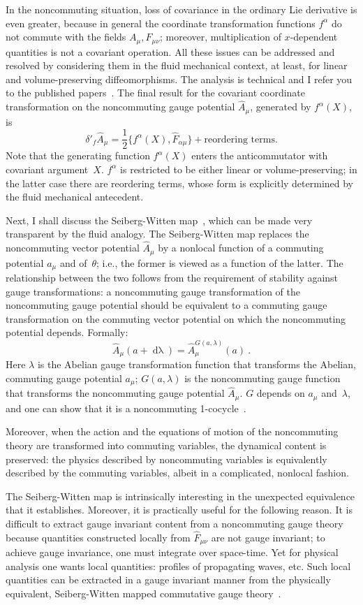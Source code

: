 \documentclass[a4paper,12pt,twoside]{article}
\newcommand{\rd}[1]{\mathop{\mathrm{d}#1}}
\newcommand{\fract}[2]{{\textstyle\frac{#1}{#2}}}
\newcommand{\numeq}[2]{\begin{equation}
#2
\label{#1}
\end{equation}}
\let\hat\widehat
\begin{document}
In the noncommuting situation, loss of covariance in the ordinary Lie derivative is even
greater, because in general the coordinate transformation functions $f^\alpha$ do not
commute with the fields $A_\mu, F_{\mu\nu}$; moreover, multiplication of $x$-dependent
quantities is not a covariant operation. All these issues can be addressed and resolved by
considering them in the fluid mechanical context, at least, for linear and volume-preserving
diffeomorphisms. The analysis is technical and I refer you to the published papers~\cite{r3,r6}.
The final result for the covariant coordinate transformation on the noncommuting gauge
potential $\hat A_\mu$, generated by $f^\alpha (X)$, is 
\numeq{en25}{
\delta'_f \hat A_\mu = \fract12 \bigl\{
f^\alpha(X), \hat F_{\alpha\mu}\bigr\} + \mbox{reordering terms.}
}
Note that the generating function $f^\alpha(X)$ enters the anticommutator with covariant
argument~$X$. $f^\alpha$ is restricted to be either linear or volume-preserving; in the latter
case there are reordering terms, whose form is explicitly determined by the fluid mechanical
antecedent.

Next, I shall discuss the Seiberg-Witten map~\cite{r7}, which can be made very
transparent by the fluid analogy.  The Seiberg-Witten map replaces the noncommuting vector
potential $\hat A_\mu$  by a nonlocal function of a commuting potential $a_\mu$ and
of~$\theta$;  i.e., the former is viewed as a function of the latter.  The relationship between the
two follows from the requirement of stability against gauge transformations: a noncommuting
gauge transformation  of the noncommuting gauge potential should be equivalent to a
commuting gauge transformation on the commuting vector potential on which the
noncommuting potential depends. Formally:
\numeq{en26}{
\hat A_\mu(a + \rd \lambda) = \hat A_\mu^{G(a,\lambda)} (a)\ .
}
Here $\lambda$ is the Abelian gauge transformation function that transforms the Abelian,
commuting gauge potential $a_\mu$; $G(a,\lambda)$ is the noncommuting gauge function that
transforms the noncommuting gauge potential $\hat A_\mu$. $G$ depends on $a_\mu$
and~$\lambda$, and one can show that it is a noncommuting 1-cocycle~\cite{r8n}.

Moreover, when the action and the equations of motion of
the noncommuting theory are transformed into commuting variables, the dynamical content
is preserved: the physics described by noncommuting variables is equivalently described by
the commuting variables, albeit in a complicated, nonlocal fashion. 

  The Seiberg-Witten map is intrinsically interesting in the unexpected equivalence that it
establishes. Moreover, it is practically useful for the following reason. It is difficult to extract
gauge invariant content from a noncommuting gauge theory because quantities constructed
locally from $\hat F_{\mu\nu}$ are not gauge invariant; to achieve gauge invariance, one must
integrate over space-time. Yet for physical analysis one wants local quantities: profiles of
propagating waves, etc.  Such local quantities can be extracted in a gauge invariant manner
from the physically equivalent, Seiberg-Witten mapped commutative gauge theory~\cite{r8}. 
\end{document}
